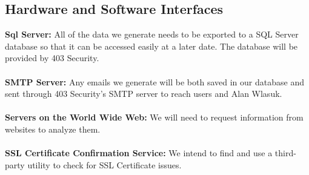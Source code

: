 \subsection{Hardware and Software Interfaces}
 
\textbf{Sql Server: } All of the data we generate needs to be exported to a SQL Server database so that it can be accessed easily at a later date. The database will be provided by 403 Security.
\\
\\
\textbf{SMTP Server: } Any emails we generate will be both saved in our database and sent through 403 Security's SMTP server to reach users and Alan Wlasuk.
\\
\\
\textbf{Servers on the World Wide Web: } We will need to request information from websites to analyze them. 
\\
\\
\textbf{SSL Certificate Confirmation Service: } We intend to find and use a third-party utility to check for SSL Certificate issues.
